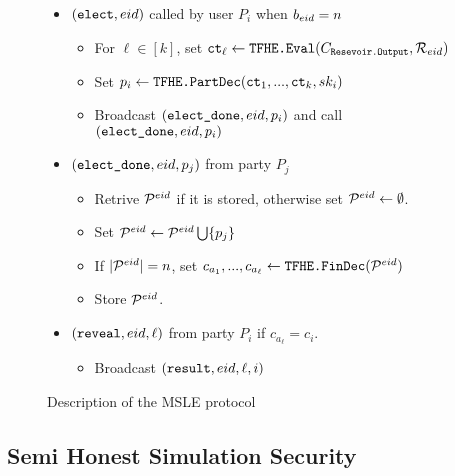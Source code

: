 \begin{figure}[H]
{\begin{minipage}{1\textwidth}
\begin{itemize}
				\item $(\texttt{elect}, {eid})$ called by user $P_i$ when  $b_{eid} = n$
				      \begin{itemize}
					      \item For $\ell \in [k]$, set $\texttt{ct}_{\ell} \gets \texttt{TFHE.Eval}(C_{\texttt{Resevoir.Output}}, \mathcal{R}_{eid})$
					      \item Set $p_i \gets \texttt{TFHE.PartDec}(\texttt{ct}_1, ..., \texttt{ct}_k, sk_i)$
					      \item Broadcast $(\texttt{elect\_done}, {eid}, p_i)$ and call $(\texttt{elect\_done}, {eid}, p_i)$
				      \end{itemize}
				\item $(\texttt{elect\_done}, {eid}, p_j)$ from party $P_j$
				      \begin{itemize}
					      \item Retrive $\mathcal{P}^{eid}$ if it is stored, otherwise set $\mathcal{P}^{eid} \gets \emptyset$.
					      \item Set $\mathcal{P}^{eid} \gets \mathcal{P}^{eid} \bigcup \{p_j\}$
					      \item If $|\mathcal{P}^{eid}| = n$, set $c_{a_1}, ..., c_{a_\ell} \gets \texttt{TFHE.FinDec}(\mathcal{P}^{eid})$
					      \item Store $\mathcal{P}^{eid}$.
				      \end{itemize}
				\item $(\texttt{reveal}, {eid}, \ell)$ from party $P_i$ if $c_{a_\ell} = c_i$.
				      \begin{itemize}
					      \item Broadcast $(\texttt{result}, {eid}, \ell, i)$
				      \end{itemize}
			\end{itemize}
		\end{minipage}
	}
	\caption{Description of the MSLE protocol}
	\label{fig:protocolMSLE}
\end{figure}


\subsection{Semi Honest Simulation Security}


